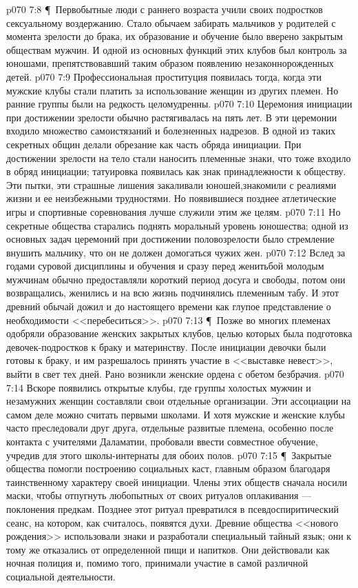 \vs p070 7:8 \P\ Первобытные люди с раннего возраста учили своих подростков сексуальному воздержанию. Стало обычаем забирать мальчиков у родителей с момента зрелости до брака, их образование и обучение было вверено закрытым обществам мужчин. И одной из основных функций этих клубов был контроль за юношами, препятствовавший таким образом появлению незаконнорожденных детей.
\vs p070 7:9 Профессиональная проституция появилась тогда, когда эти мужские клубы стали платить за использование женщин из других племен. Но ранние группы были на редкость целомудренны.
\vs p070 7:10 Церемония инициации при достижении зрелости обычно растягивалась на пять лет. В эти церемонии входило множество самоистязаний и болезненных надрезов. В одной из таких секретных общин делали обрезание как часть обряда инициации. При достижении зрелости на тело стали наносить племенные знаки, что тоже входило в обряд инициации; татуировка появилась как знак принадлежности к обществу. Эти пытки, эти страшные лишения закаливали юношей,знакомили с реалиями жизни и ее неизбежными трудностями. Но появившиеся позднее атлетические игры и спортивные соревнования лучше служили этим же целям.
\vs p070 7:11 Но секретные общества старались поднять моральный уровень юношества; одной из основных задач церемоний при достижении половозрелости было стремление внушить мальчику, что он не должен домогаться чужих жен.
\vs p070 7:12 Вслед за годами суровой дисциплины и обучения и сразу перед женитьбой молодым мужчинам обычно предоставляли короткий период досуга и свободы, потом они возвращались, женились и на всю жизнь подчинялись племенным табу. И этот древний обычай дожил и до настоящего времени как глупое представление о необходимости <<перебеситься>>.
\vs p070 7:13 \P\ Позже во многих племенах одобряли образование женских закрытых клубов, целью которых была подготовка девочек\hyp{}подростков к браку и материнству. После инициации девочки были готовы к браку, и им разрешалось принять участие в <<выставке невест>>, выйти в свет тех дней. Рано возникли женские ордена с обетом безбрачия.
\vs p070 7:14 Вскоре появились открытые клубы, где группы холостых мужчин и незамужних женщин составляли свои отдельные организации. Эти ассоциации на самом деле можно считать первыми школами. И хотя мужские и женские клубы часто преследовали друг друга, отдельные развитые племена, особенно после контакта с учителями Даламатии, пробовали ввести совместное обучение, учредив для этого школы\hyp{}интернаты для обоих полов.
\vs p070 7:15 \P\ Закрытые общества помогли построению социальных каст, главным образом благодаря таинственному характеру своей инициации. Члены этих обществ сначала носили маски, чтобы отпугнуть любопытных от своих ритуалов оплакивания --- поклонения предкам. Позднее этот ритуал превратился в псевдоспиритический сеанс, на котором, как считалось, появятся духи. Древние общества <<нового рождения>> использовали знаки и разработали специальный тайный язык; они к тому же отказались от определенной пищи и напитков. Они действовали как ночная полиция и, помимо того, принимали участие в самой различной социальной деятельности.
